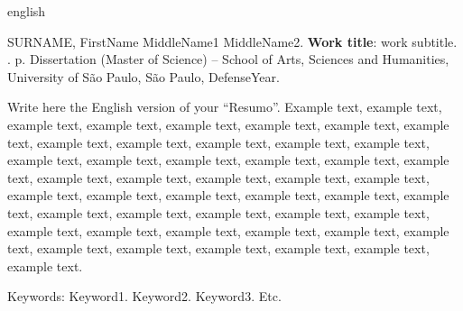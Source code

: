 \documentclass[
	12pt,				%
	oneside,			%
	a4paper,			%
	english,			%
	brazil				%
	]{abntex2ppgsi}
\begin{document}
% 
% 
\begin{resumo}[Abstract]
\begin{otherlanguage*}{english}

% 
%
%
%
\begin{flushleft}
SURNAME, FirstName MiddleName1 MiddleName2. \textbf{Work title}: work subtitle. \imprimirdata. \pageref{LastPage} p. Dissertation (Master of Science) – School of Arts, Sciences and Humanities, University of São Paulo, São Paulo, DefenseYear. 
\end{flushleft}

Write here the English version of your ``Resumo''. Example text, example text, example text, example text, example text, example text, example text, example text, example text, example text, example text, example text, example text, example text, example text, example text, example text, example text, example text, example text, example text, example text, example text, example text, example text, example text, example text, example text, example text, example text, example text, example text, example text, example text, example text, example text, example text, example text, example text, example text, example text, example text, example text, example text, example text, example text, example text.

Keywords: Keyword1. Keyword2. Keyword3. Etc.
\end{otherlanguage*}
\end{resumo}

\listoffigures*
\cleardoublepage
\end{document}
